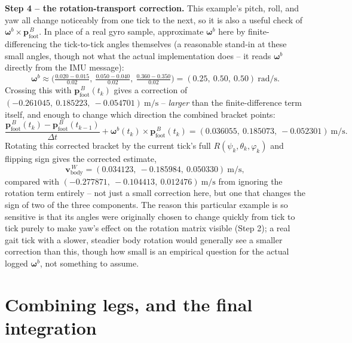 \documentclass[11pt]{article}
\begin{document}
\noindent \textbf{Step 4 -- the rotation-transport correction.} This
example's pitch, roll, and yaw all change noticeably from one tick to the
next, so it is also a useful check of $\boldsymbol\omega^{b}\times
\mathbf{p}_{\text{foot}}^{\,B}$. In place of a real gyro sample, approximate
$\boldsymbol\omega^{b}$ here by finite-differencing the tick-to-tick angles
themselves (a reasonable stand-in at these small angles, though not what
the actual implementation does -- it reads $\boldsymbol\omega^{b}$ directly
from the IMU message):
\begin{equation}
\boldsymbol\omega^{b} \approx \Big(\tfrac{0.020-0.015}{0.02},\ \tfrac{0.050-0.040}{0.02},\ \tfrac{0.360-0.350}{0.02}\Big)
= (0.25,\ 0.50,\ 0.50)\ \text{rad/s}.
\end{equation}
Crossing this with $\mathbf{p}_{\text{foot}}^{\,B}(t_k)$ gives a correction
of $(-0.261045,\ 0.185223,\ -0.054701)\ \text{m/s}$ -- \emph{larger} than the
finite-difference term itself, and enough to change which direction the
combined bracket points:
\begin{equation}
\frac{\mathbf{p}_{\text{foot}}^{\,B}(t_k) - \mathbf{p}_{\text{foot}}^{\,B}(t_{k-1})}{\Delta t} + \boldsymbol\omega^{b}(t_k)\times\mathbf{p}_{\text{foot}}^{\,B}(t_k)
= (0.036055,\ 0.185073,\ -0.052301)\ \text{m/s}.
\end{equation}
Rotating this corrected bracket by the current tick's full
$R(\psi_k,\theta_k,\varphi_k)$ and flipping sign gives the corrected
estimate,
\begin{equation}
\mathbf{v}_{\text{body}}^{\,W} = (0.034123,\ -0.185984,\ 0.050330)\ \text{m/s},
\end{equation}
compared with $(-0.277871,\ -0.104413,\ 0.012476)\ \text{m/s}$ from ignoring
the rotation term entirely -- not just a small correction here, but one
that changes the sign of two of the three components. The reason this
particular example is so sensitive is that its angles were originally
chosen to change quickly from tick to tick purely to make yaw's effect on
the rotation matrix visible (Step 2); a real gait tick with a slower,
steadier body rotation would generally see a smaller correction than this,
though how small is an empirical question for the actual logged
$\boldsymbol\omega^{b}$, not something to assume.

\section{Combining legs, and the final integration}
\end{document}
